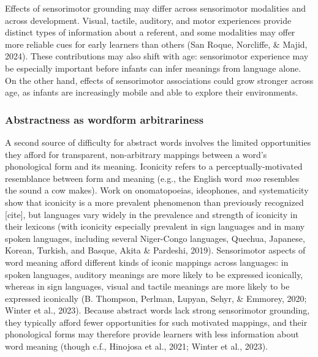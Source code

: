 \documentclass[
  man,floatsintext]{apa6}
\begin{document}
Effects of sensorimotor grounding may differ across sensorimotor modalities and across development. Visual, tactile, auditory, and motor experiences provide distinct types of information about a referent, and some modalities may offer more reliable cues for early learners than others (San Roque, Norcliffe, \& Majid, 2024). These contributions may also shift with age: sensorimotor experience may be especially important before infants can infer meanings from language alone. On the other hand, effects of sensorimotor associations could grow stronger across age, as infants are increasingly mobile and able to explore their environments.

\subsubsection{Abstractness as wordform arbitrariness}\label{abstractness-as-wordform-arbitrariness}

A second source of difficulty for abstract words involves the limited opportunities they afford for transparent, non-arbitrary mappings between a word's phonological form and its meaning. Iconicity refers to a perceptually-motivated resemblance between form and meaning (e.g., the English word \emph{moo} resembles the sound a cow makes). Work on onomatopoeias, ideophones, and systematicity show that iconicity is a more prevalent phenomenon than previously recognized {[}cite{]}, but languages vary widely in the prevalence and strength of iconicity in their lexicons (with iconicity especially prevalent in sign languages and in many spoken languages, including several Niger-Congo languages, Quechua, Japanese, Korean, Turkish, and Basque, Akita \& Pardeshi, 2019). Sensorimotor aspects of word meaning afford different kinds of iconic mappings across languages: in spoken languages, auditory meanings are more likely to be expressed iconically, whereas in sign languages, visual and tactile meanings are more likely to be expressed iconically (B. Thompson, Perlman, Lupyan, Sehyr, \& Emmorey, 2020; Winter et al., 2023). Because abstract words lack strong sensorimotor grounding, they typically afford fewer opportunities for such motivated mappings, and their phonological forms may therefore provide learners with less information about word meaning (though c.f., Hinojosa et al., 2021; Winter et al., 2023).
\end{document}
